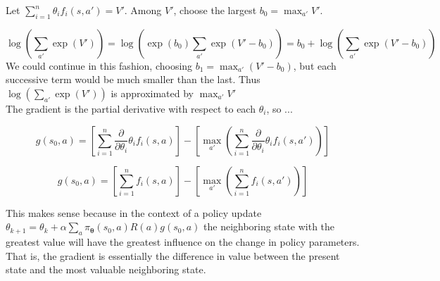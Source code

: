 \documentclass[fleqn]{hw5}
\begin{document}
Let $ \sum_{i=1}^n \theta_i f_i(s,a') = V' $. Among $V'$, choose the largest $b_0=\max_{a'}V'$.

\begin{equation}
\log \left( \sum_{a'} \exp \left( V' \right) \right) = \log \left( \exp ( b_0 ) \sum_{a'} \exp \left( V' - b_0 \right) \right)
= b_0 + \log \left( \sum_{a'} \exp \left( V' - b_0 \right) \right)
\end{equation}
We could continue in this fashion, choosing $b_1=\max_{a'}(V'-b_0)$, but each successive term would be much smaller than the last.
Thus $\log \left( \sum_{a'} \exp \left( V' \right) \right)$ is approximated by $ \max_{a'}V' $\\
The gradient is the partial derivative with respect to each $\theta_i$, so ...

\begin{equation}
g(s_0,a) = \left[  \sum_{i=1}^n \frac{\partial}{\partial \theta_i} \theta_i f_i(s,a) \right]
-  \left[ \max_{a'} \left( \sum_{i=1}^n \frac{\partial}{\partial \theta_i} \theta_i f_i(s,a') \right) \right]
\end{equation}

\begin{equation}
g(s_0,a) = \left[  \sum_{i=1}^n f_i(s,a) \right]
-  \left[ \max_{a'} \left( \sum_{i=1}^n f_i(s,a') \right) \right]
\end{equation}

This makes sense because in the context of a policy update 
$ \theta_{k+1} = \theta_k + \alpha \sum_a \pi_{\mathbf \theta}(s_0,a) R(a) g(s_0,a) $ the neighboring state 
with the greatest value will have the greatest influence on the change in policy parameters. That is, the gradient is essentially
the difference in value between the present state and the most valuable neighboring state.
\end{document}

